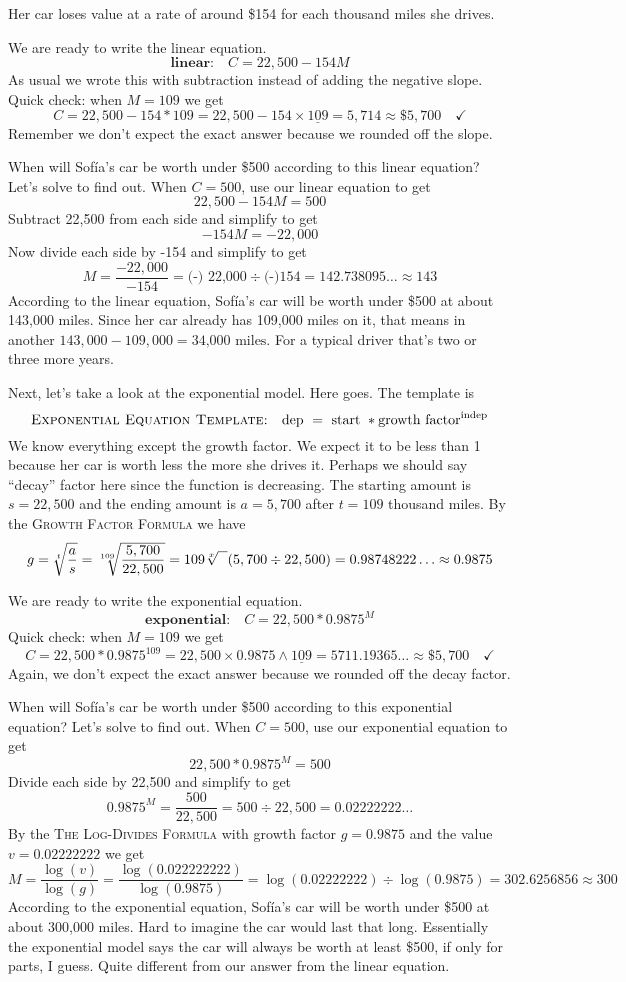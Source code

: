 \noindent
Her car loses value at a rate of around \$154 for each thousand miles she drives.  

We are ready to write the linear equation.  
$$\textbf{linear:} \quad C = 22,500 - 154M$$  
As usual we wrote this with subtraction instead of adding the negative slope.  
Quick check:   when $M=109$ we get $$C =  22,500 - 154\ast 109 =  22,500 - 154\times \underline{109}= 5,714 \approx \$5,700 \quad \checkmark$$
Remember we don't expect the exact answer because we rounded off the slope.  

When will Sof\'{i}a's car be worth under \$500 according to this linear equation?  Let's solve to find out.  When $C=500$, use our linear equation to get 
$$ 22,500 - 154M =500$$
Subtract 22,500 from each side and simplify to get
$$-154M= -22,000$$
 Now divide each side by -154 and simplify to get
$$M = \frac{-22,000}{-154} = \text{(-) 22,000} \div  \text{(-)}154= 142.738095\ldots \approx 143$$
According to the linear equation, Sof\'{i}a's car will be worth under \$500 at about 143,000 miles.  Since her car already has 109,000 miles on it, that means in another $143,000-109,000 = \text{34,000 miles}$.  For a typical driver that's two or three more years.

Next, let's take a look at the exponential model.  Here goes.  The template is $$\textsc{Exponential Equation Template:} \quad \text{dep }=\text{ start } \ast \text{growth factor}^{\text{indep}}$$
We know everything except the growth factor.   We expect it to be less than 1 because her car is worth less the more she drives it.  Perhaps we should say ``decay'' factor here since the function is decreasing. The starting amount is $s=22,500$ and the ending amount is $a=5,700$ after $t=109$ thousand miles.  By the  \textsc{Growth Factor Formula} we have
$$g = \sqrt[t]{\frac{a}{s}} = \sqrt[109]{\frac{5,700}{22,500}}
= 109  \sqrt[x]{\text{\raisebox{0.6em}{~\text{  }}}}( 5,700 \div 22,500)= 0.98748222\ldots \approx 0.9875$$

We are ready to write the exponential equation.  
$$\textbf{exponential:} \quad C = 22,500 \ast 0.9875^M$$
Quick check:  when $M=109$ we get $$C =  22,500 \ast 0.9875^{109} =  22,500 \times 0.9875 \wedge\underline{109}= 5711.19365\ldots \approx \$5,700 \quad \checkmark$$
Again, we don't expect the exact answer because we rounded off the decay factor.  

When will Sof\'{i}a's car be worth under \$500 according to this exponential equation?  Let's solve to find out.  When $C=500$, use our exponential equation to get  
$$ 22,500 \ast 0.9875^M =500$$
Divide each side by 22,500 and simplify to get
$$0.9875^M= \frac{500}{22,500} = 500 \div 22,500 = 0.02222222\ldots$$
By the \textsc{The Log-Divides Formula} with growth factor $g=0.9875$ and the value $v= 0.02222222$ we get 
$$M =  \frac{\log (v)}{\log(g)}=  \frac{\log (0.022222222)}{\log(0.9875)} =  \log (0.02222222) \div \log (0.9875) = 302.6256856 \approx 300$$
According to the exponential equation, Sof\'{i}a's car will be worth under \$500 at about 300,000 miles.  Hard to imagine the car would last that long.  Essentially the exponential model says the car will always be worth at least \$500, if only for parts, I guess.  Quite different from our answer from the linear equation.

